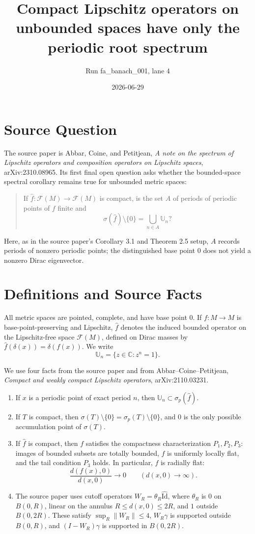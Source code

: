 \documentclass[11pt]{article}
\title{Compact Lipschitz operators on unbounded spaces have only the periodic root spectrum}
\author{Run fa\_banach\_001, lane 4}
\date{2026-06-29}
\newcommand{\F}{\mathcal F}
\newcommand{\U}{\mathbb U}
\newcommand{\C}{\mathbb C}
\begin{document}
\maketitle

\section*{Source Question}

The source paper is Abbar, Coine, and Petitjean,
\emph{A note on the spectrum of Lipschitz operators and composition operators
on Lipschitz spaces}, arXiv:2310.08965.  Its first final open question asks
whether the bounded-space spectral corollary remains true for unbounded metric
spaces:

\begin{quote}
If \(\widehat f:\F(M)\to\F(M)\) is compact, is the set \(A\) of periods of
periodic points of \(f\) finite and
\[
\sigma(\widehat f)\setminus\{0\}=\bigcup_{n\in A}\U_n?
\]
\end{quote}
Here, as in the source paper's Corollary 3.1 and Theorem 2.5 setup, \(A\)
records periods of nonzero periodic points; the distinguished base point
\(0\) does not yield a nonzero Dirac eigenvector.

\section*{Definitions and Source Facts}

All metric spaces are pointed, complete, and have base point \(0\).  If
\(f:M\to M\) is base-point-preserving and Lipschitz, \(\widehat f\) denotes
the induced bounded operator on the Lipschitz-free space \(\F(M)\), defined on
Dirac masses by \(\widehat f(\delta(x))=\delta(f(x))\).  We write
\[
\U_n=\{z\in\C:z^n=1\}.
\]

We use four facts from the source paper and from Abbar--Coine--Petitjean,
\emph{Compact and weakly compact Lipschitz operators}, arXiv:2110.03231.

\begin{enumerate}
\item If \(x\) is a periodic point of exact period \(n\), then
\(\U_n\subset \sigma_p(\widehat f)\).
\item If \(T\) is compact, then
\(\sigma(T)\setminus\{0\}=\sigma_p(T)\setminus\{0\}\), and \(0\) is the only
possible accumulation point of \(\sigma(T)\).
\item If \(\widehat f\) is compact, then \(f\) satisfies the compactness
characterization \(P_1,P_2,P_3\): images of bounded subsets are totally
bounded, \(f\) is uniformly locally flat, and the tail condition \(P_3\) holds.
In particular, \(f\) is radially flat:
\[
 \frac{d(f(x),0)}{d(x,0)}\longrightarrow 0
 \qquad (d(x,0)\to\infty).
\]
\item The source paper uses cutoff operators \(W_R=\theta_R\widehat{\mathrm{Id}}\),
where \(\theta_R\) is \(0\) on \(B(0,R)\), linear on the annulus
\(R\le d(x,0)\le 2R\), and \(1\) outside \(B(0,2R)\).  These satisfy
\(\sup_R\|W_R\|\le 4\), \(W_R\gamma\) is supported outside \(B(0,R)\), and
\((I-W_R)\gamma\) is supported in \(B(0,2R)\).
\end{enumerate}
\end{document}
